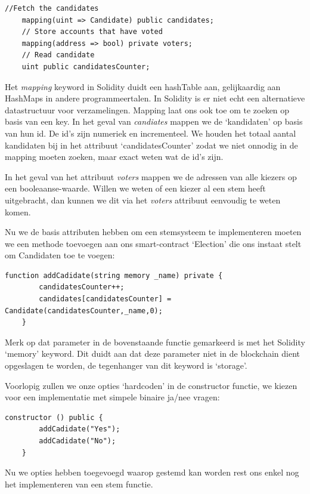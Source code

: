 	\begin{lstlisting}[numbers=none]
	//Fetch the candidates	
	mapping(uint => Candidate) public candidates;
	// Store accounts that have voted
	mapping(address => bool) private voters;
	// Read candidate
	uint public candidatesCounter;
	\end{lstlisting}
	
	Het \textit{mapping} keyword in Solidity duidt een hashTable aan, gelijkaardig aan HashMaps in andere programmeertalen. In Solidity is er niet echt een alternatieve datastructuur voor verzamelingen.  Mapping laat ons ook toe om te zoeken op basis van een key. In het geval van  \textit{candiates} mappen we de `kandidaten' op basis van hun id. De id's zijn numeriek en incrementeel. We houden het totaal aantal kandidaten bij in het attribuut `candidatesCounter' zodat we niet onnodig in de mapping moeten zoeken, maar exact weten wat de id's zijn.
	
	In het geval van het attribuut \textit{voters} mappen we de adressen van alle kiezers op een booleaanse-waarde. Willen we weten of een kiezer al een stem heeft uitgebracht, dan kunnen we dit via het \textit{voters} attribuut eenvoudig te weten komen. 
	
	Nu we de basis attributen hebben om een stemsysteem te implementeren moeten we een methode toevoegen aan ons smart-contract `Election' die ons instaat stelt om Candidaten toe te voegen:
	
	\begin{lstlisting}[numbers=none]
	function addCadidate(string memory _name) private {
		candidatesCounter++;
		candidates[candidatesCounter] = Candidate(candidatesCounter,_name,0);
	}
	\end{lstlisting}
	Merk op dat parameter in de bovenstaande functie gemarkeerd is met het Solidity `memory'  keyword. Dit duidt aan dat deze parameter niet in de blockchain dient opgeslagen te worden, de tegenhanger van dit keyword is `storage'.
	
	Voorlopig zullen we onze opties `hardcoden' in de constructor functie, we kiezen voor een implementatie met simpele binaire ja/nee vragen:
	
	\begin{lstlisting}[numbers=none]
	constructor () public {
		addCadidate("Yes");
		addCadidate("No");
	}
	\end{lstlisting}
	
	Nu we opties hebben toegevoegd waarop gestemd kan worden rest ons enkel nog het implementeren van een stem functie. 
	
